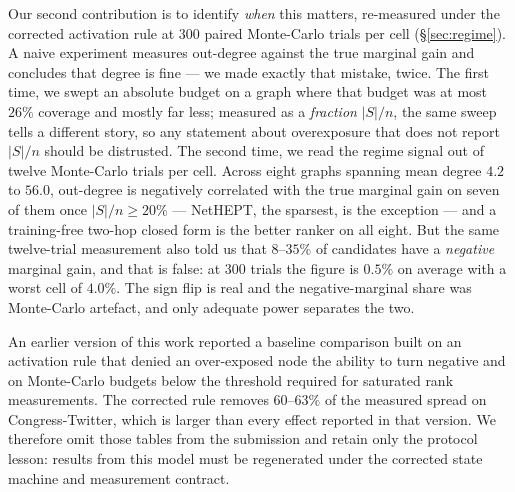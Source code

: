 Our second contribution is to identify \emph{when} this matters, re-measured under the corrected
activation rule at $300$ paired Monte-Carlo trials per cell (\S\ref{sec:regime}). A naive experiment
measures out-degree against the true marginal gain and concludes that degree is fine --- we made
exactly that mistake, twice. The first time, we swept an absolute budget on a graph where that
budget was at most $26\%$ coverage and mostly far less; measured as a \emph{fraction} $|S|/n$, the
same sweep tells a different story, so any statement about overexposure that does not report
$|S|/n$ should be distrusted. The second time, we read the regime signal out of twelve Monte-Carlo
trials per cell. Across eight graphs spanning mean degree $4.2$ to $56.0$, out-degree is negatively
correlated with the true marginal gain on seven of them once $|S|/n \ge 20\%$ --- NetHEPT, the
sparsest, is the exception --- and a training-free two-hop closed form is the better ranker on all
eight. But the same twelve-trial measurement also told us that $8$--$35\%$ of candidates have a
\emph{negative} marginal gain, and that is false: at $300$ trials the figure is $0.5\%$ on average
with a worst cell of $4.0\%$. The sign flip is real and the negative-marginal share was Monte-Carlo
artefact, and only adequate power separates the two.

An earlier version of this work reported a baseline comparison built on an activation rule that
denied an over-exposed node the ability to turn negative and on Monte-Carlo budgets below the
threshold required for saturated rank measurements.  The corrected rule removes $60$--$63\%$ of
the measured spread on Congress-Twitter, which is larger than every effect reported in that
version.  We therefore omit those tables from the submission and retain only the protocol lesson:
results from this model must be regenerated under the corrected state machine and measurement
contract.

